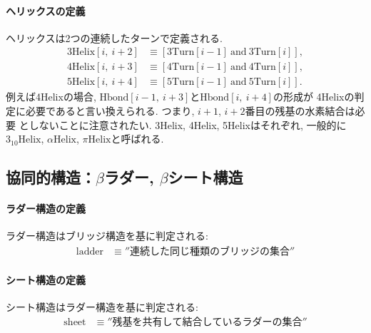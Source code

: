 \paragraph{ヘリックスの定義}
ヘリックスは2つの連続したターンで定義される.
\begin{align}
 \mathrm{3Helix}[i,~i+2]
&\equiv
 [\mathrm{3Turn}[i-1]~ \mathrm{and}~ \mathrm{3Turn}[i]], \\
 \mathrm{4Helix}[i,~i+3]
&\equiv
 [\mathrm{4Turn}[i-1]~ \mathrm{and}~ \mathrm{4Turn}[i]], \\
 \mathrm{5Helix}[i,~i+4]
&\equiv
 [\mathrm{5Turn}[i-1]~ \mathrm{and}~ \mathrm{5Turn}[i]].
\end{align}
例えば4Helixの場合, $\mathrm{Hbond}[i-1,~ i+3]$と$\mathrm{Hbond}[i,~ i+4]$の形成が
4Helixの判定に必要であると言い換えられる. つまり, $i+1$, $i+2$番目の残基の水素結合は必要
としないことに注意されたい.
3Helix, 4Helix, 5Helixはそれぞれ, 一般的に$3_{10}\mathrm{Helix}$, 
$\alpha\mathrm{Helix}$, $\pi\mathrm{Helix}$と呼ばれる.

\subsection{協同的構造：$\beta$ラダー, $\beta$シート構造}
\paragraph{ラダー構造の定義}
ラダー構造はブリッジ構造を基に判定される:
\begin{align}
 \mathrm{ladder}
&\equiv
 \mathrm{''連続した同じ種類のブリッジの集合''} %
\end{align}

\paragraph{シート構造の定義}
シート構造はラダー構造を基に判定される:
\begin{align}
 \mathrm{sheet}
&\equiv
 \mathrm{''残基を共有して結合しているラダーの集合''}
\end{align}

